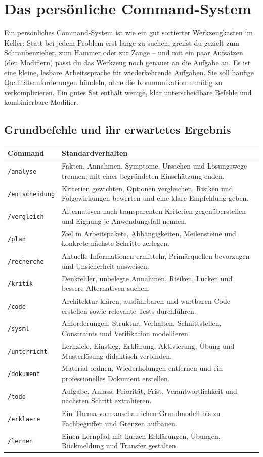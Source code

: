 \chapter{Das persönliche Command-System}

Ein persönliches Command-System ist wie ein gut sortierter Werkzeugkasten im Keller: Statt bei jedem Problem erst lange zu suchen, greifst du gezielt zum Schraubenzieher, zum Hammer oder zur Zange -- und mit ein paar Aufsätzen (den Modifiern) passt du das Werkzeug noch genauer an die Aufgabe an. Es ist eine kleine, lesbare Arbeitssprache für wiederkehrende Aufgaben. Sie soll häufige Qualitätsanforderungen bündeln, ohne die Kommunikation unnötig zu verkomplizieren. Ein gutes Set enthält wenige, klar unterscheidbare Befehle und kombinierbare Modifier.

\section{Grundbefehle und ihr erwartetes Ergebnis}

\begin{longtable}{@{}p{}p{}@{}}\toprule
\textbf{Command}&\textbf{Standardverhalten}\\\midrule\endhead
\texttt{/analyse}&Fakten, Annahmen, Symptome, Ursachen und Lösungswege trennen; mit einer begründeten Einschätzung enden.\\
\texttt{/entscheidung}&Kriterien gewichten, Optionen vergleichen, Risiken und Folgewirkungen bewerten und eine klare Empfehlung geben.\\
\texttt{/vergleich}&Alternativen nach transparenten Kriterien gegenüberstellen und Eignung je Anwendungsfall nennen.\\
\texttt{/plan}&Ziel in Arbeitspakete, Abhängigkeiten, Meilensteine und konkrete nächste Schritte zerlegen.\\
\texttt{/recherche}&Aktuelle Informationen ermitteln, Primärquellen bevorzugen und Unsicherheit ausweisen.\\
\texttt{/kritik}&Denkfehler, unbelegte Annahmen, Risiken, Lücken und bessere Alternativen suchen.\\
\texttt{/code}&Architektur klären, ausführbaren und wartbaren Code erstellen sowie relevante Tests durchführen.\\
\texttt{/sysml}&Anforderungen, Struktur, Verhalten, Schnittstellen, Constraints und Verifikation modellieren.\\
\texttt{/unterricht}&Lernziele, Einstieg, Erklärung, Aktivierung, Übung und Musterlösung didaktisch verbinden.\\
\texttt{/dokument}&Material ordnen, Wiederholungen entfernen und ein professionelles Dokument erstellen.\\
\texttt{/todo}&Aufgabe, Anlass, Priorität, Frist, Verantwortlichkeit und nächsten Schritt extrahieren.\\
\texttt{/erklaere}&Ein Thema vom anschaulichen Grundmodell bis zu Fachbegriffen und Grenzen aufbauen.\\
\texttt{/lernen}&Einen Lernpfad mit kurzen Erklärungen, Übungen, Rückmeldung und Transfer gestalten.\\\bottomrule
\end{longtable}

